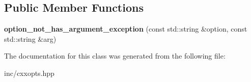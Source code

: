 \subsection*{Public Member Functions}
\begin{DoxyCompactItemize}
\item 
{\bfseries option\+\_\+not\+\_\+has\+\_\+argument\+\_\+exception} (const std\+::string \&option, const std\+::string \&arg)\hypertarget{classcxxopts_1_1option__not__has__argument__exception_afc3b2cbef0a6c2f63756bcc9f2c2746e}{}\label{classcxxopts_1_1option__not__has__argument__exception_afc3b2cbef0a6c2f63756bcc9f2c2746e}

\end{DoxyCompactItemize}


The documentation for this class was generated from the following file\+:\begin{DoxyCompactItemize}
\item 
inc/cxxopts.\+hpp\end{DoxyCompactItemize}
